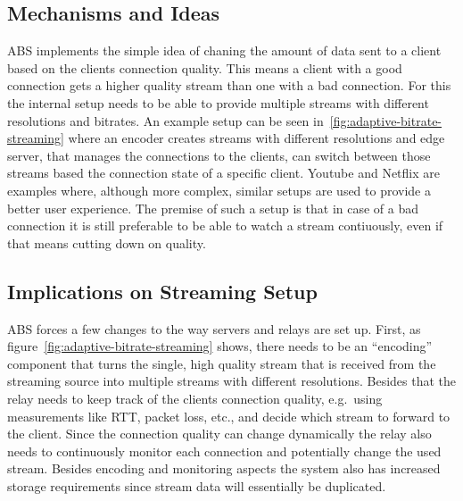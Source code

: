 \subsection{Mechanisms and Ideas}
ABS implements the simple idea of chaning the amount of data sent to a client 
based on the clients connection quality.
This means a client with a good connection gets a higher quality stream than 
one with a bad connection.
For this the internal setup needs to be able to provide multiple streams with
different resolutions and bitrates.
An example setup can be seen in~\autoref{fig:adaptive-bitrate-streaming} where
an encoder creates streams with different resolutions and edge server, that 
manages the connections to the clients, can switch between those streams based 
the connection state of a specific client.
Youtube and Netflix are examples where, although more complex, similar setups
are used to provide a better user experience.
The premise of such a setup is that in case of a bad connection it is still 
preferable to be able to watch a stream contiuously, even if that means
cutting down on quality.

\subsection{Implications on Streaming Setup}
ABS forces a few changes to the way servers and relays are set up.
First, as figure~\autoref{fig:adaptive-bitrate-streaming} shows, there needs to 
be an ``encoding'' component that turns the single, high quality stream that is 
received from the streaming source into multiple streams with different resolutions.
Besides that the relay needs to keep track of the clients connection quality, e.g.~using 
measurements like RTT, packet loss, etc., and decide which stream to forward to the client.
Since the connection quality can change dynamically the relay also needs to continuously
monitor each connection and potentially change the used stream.
Besides encoding and monitoring aspects the system also has increased storage requirements
since stream data will essentially be duplicated.
